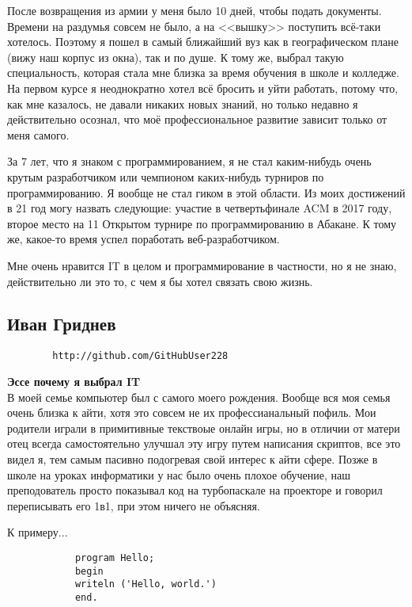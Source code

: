 \documentclass[14pt,a4paper,oneside]{extbook}
\begin{document}
		После возвращения из армии у меня было 10 дней, чтобы подать документы. Времени на раздумья совсем не было, а на <<вышку>> поступить всё-таки хотелось. Поэтому я пошел в самый ближайший вуз как в географическом плане (вижу наш корпус из окна), так и по душе. К тому же, выбрал такую специальность, которая стала мне близка за время обучения в школе и колледже. На первом курсе я неоднократно хотел всё бросить и уйти работать, потому что, как мне казалось, не давали никаких новых знаний, но только недавно я действительно осознал, что моё профессиональное развитие зависит только от меня самого.
		
		За 7 лет, что я знаком с программированием, я не стал каким-нибудь очень крутым разработчиком или чемпионом каких-нибудь турниров по программированию. Я вообще не стал гиком в этой области. Из моих достижений в 21 год могу назвать следующие: участие в четвертьфинале ACM в 2017 году, второе место на 11 Открытом турнире по программированию в Абакане. К тому же, какое-то время успел поработать веб-разработчиком.
		
		Мне очень нравится IT в целом и программирование в частности, но я не знаю, действительно ли это то, с чем я бы хотел связать свою жизнь.
		
		\subsection{Иван Гриднев}
		\begin{verbatim}
		http://github.com/GitHubUser228
		\end{verbatim}
		
		\noindent\textbf{Эссе почему я выбрал IT}\\

		В моей семье компьютер был с самого моего рождения. Вообще вся моя семья очень близка к айти, хотя это совсем не их профессианальный пофиль. Мои родители играли в примитивные текствоые онлайн игры, но в отличии от матери отец всегда самостоятельно улучшал эту игру путем написания скриптов, все это видел я, тем самым пасивно подогревая свой интерес к айти сфере. 
		Позже в школе на уроках информатики у нас было очень плохое обучение, наш преподователь просто показывал код на турбопаскале на проекторе и говорил переписывать его 1в1, при этом ничего не объясняя. 
		
		К примеру...
		\begin{verbatim}
			program Hello;
			begin
			writeln ('Hello, world.')
			end.
		\end{verbatim}
\end{document}
